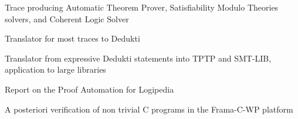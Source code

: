 \begin{workpackage}
\begin{wpdelivs}
  \begin{wpdeliv}[due=48,id=ATPtrace2,dissem=PU,nature=DEM,lead=Lie]
    {Trace producing Automatic Theorem Prover, Satisfiability Modulo
      Theories solvers, and Coherent Logic Solver}
  \end{wpdeliv}

  \begin{wpdeliv}[due=48,id=Trace2Dedukti2,dissem=PU,nature=DEM,lead=Imt]
    {Translator for most traces to Dedukti}
  \end{wpdeliv}

  \begin{wpdeliv}[due=48,id=Dedukti2ATP2,dissem=PU,nature=DEM,lead=Sac]
    {Translator from expressive Dedukti statements into TPTP and
      SMT-LIB, application to large libraries}
  \end{wpdeliv}

  \begin{wpdeliv}[due=48,id=ReadinessReport,dissem=PU,nature=R,lead=Inn]
    {Report on the Proof Automation for Logipedia}
  \end{wpdeliv}

  \begin{wpdeliv}[due=48,id=Why3,dissem=PU,nature=DEM,lead=Cea]
    {A posteriori verification of non trivial C programs in the
      Frama-C-WP platform}
  \end{wpdeliv}

\end{wpdelivs}
\end{workpackage}

